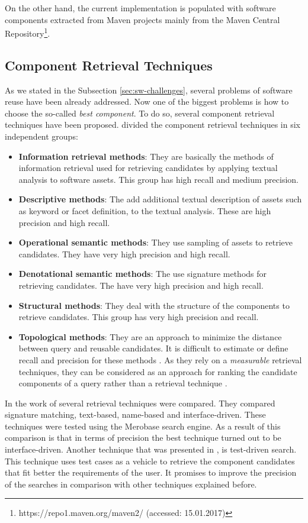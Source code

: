 On the other hand, the current implementation is populated with software components extracted from Maven projects mainly from the Maven Central Repository\footnote{https://repo1.maven.org/maven2/ (accessed: 15.01.2017)}. 

\subsection{Component Retrieval Techniques}
As we stated in the Subsection \ref{sec:sw-challenges}, several problems of software reuse have been already addressed. Now one of the biggest problems is how to choose the so-called \emph{best component}. To do so, several component retrieval techniques have been proposed. \citet{Mili1998} divided the component retrieval techniques in six independent groups:

\begin{itemize}
\item \textbf{Information retrieval methods}: They are basically the methods of information retrieval used for retrieving candidates by applying textual analysis to software assets. This group has high recall and medium precision.
\item \textbf{Descriptive methods}: The add additional textual description of assets such as keyword or facet definition, to the textual analysis. These are high precision and high recall.
\item \textbf{Operational semantic methods}: They use sampling of assets to retrieve candidates. They have very high precision and high recall.
\item \textbf{Denotational semantic methods}: The use signature methods for retrieving candidates. The have very high precision and high recall.
\item \textbf{Structural methods}: They deal with the structure of the components to retrieve candidates. This group has very high precision and recall.
\item \textbf{Topological methods}: They are an approach to minimize the distance between query and reusable candidates. It is difficult to estimate or define recall and precision for these methods \cite{Mili1998}. As they rely on a \textit{measurable} retrieval techniques, they can be considered as an approach for ranking the candidate components of a query rather than a retrieval technique \cite{Hummel2007}.
\end{itemize}

In the work of \citet{Hummel2007} several retrieval techniques were compared. They compared signature matching, text-based, name-based and interface-driven. These techniques were tested using the Merobase search engine. As a result of this comparison is that in terms of precision the best technique turned out to be interface-driven. Another technique that was presented in \cite{Hummel2004}, is test-driven search. This technique uses test cases as a vehicle to retrieve the component candidates that fit better the requirements of the user. It promises to improve the precision of the searches in comparison with other techniques explained before.

